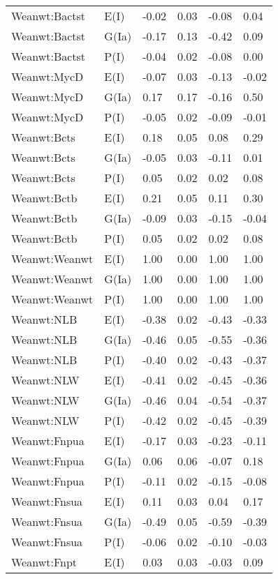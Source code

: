 \begin{center}
\begin{longtable}{|p{1.1in}|p{0.7in}|p{0.7in}|p{0.6in}|p{0.6in}|p{0.6in}|}
  Weanwt:Bactst & E(I) & -0.02 & 0.03 & -0.08 & 0.04 \\ 
  Weanwt:Bactst & G(Ia) & -0.17 & 0.13 & -0.42 & 0.09 \\ 
  Weanwt:Bactst & P(I) & -0.04 & 0.02 & -0.08 & 0.00 \\ 
  Weanwt:MycD & E(I) & -0.07 & 0.03 & -0.13 & -0.02 \\ 
  Weanwt:MycD & G(Ia) & 0.17 & 0.17 & -0.16 & 0.50 \\ 
  Weanwt:MycD & P(I) & -0.05 & 0.02 & -0.09 & -0.01 \\ 
  Weanwt:Bcts & E(I) & 0.18 & 0.05 & 0.08 & 0.29 \\ 
  Weanwt:Bcts & G(Ia) & -0.05 & 0.03 & -0.11 & 0.01 \\ 
  Weanwt:Bcts & P(I) & 0.05 & 0.02 & 0.02 & 0.08 \\ 
  Weanwt:Bctb & E(I) & 0.21 & 0.05 & 0.11 & 0.30 \\ 
  Weanwt:Bctb & G(Ia) & -0.09 & 0.03 & -0.15 & -0.04 \\ 
  Weanwt:Bctb & P(I) & 0.05 & 0.02 & 0.02 & 0.08 \\ 
  Weanwt:Weanwt & E(I) & 1.00 & 0.00 & 1.00 & 1.00 \\ 
  Weanwt:Weanwt & G(Ia) & 1.00 & 0.00 & 1.00 & 1.00 \\ 
  Weanwt:Weanwt & P(I) & 1.00 & 0.00 & 1.00 & 1.00 \\ 
  Weanwt:NLB & E(I) & -0.38 & 0.02 & -0.43 & -0.33 \\ 
  Weanwt:NLB & G(Ia) & -0.46 & 0.05 & -0.55 & -0.36 \\ 
  Weanwt:NLB & P(I) & -0.40 & 0.02 & -0.43 & -0.37 \\ 
  Weanwt:NLW & E(I) & -0.41 & 0.02 & -0.45 & -0.36 \\ 
  Weanwt:NLW & G(Ia) & -0.46 & 0.04 & -0.54 & -0.37 \\ 
  Weanwt:NLW & P(I) & -0.42 & 0.02 & -0.45 & -0.39 \\ 
  Weanwt:Fnpua & E(I) & -0.17 & 0.03 & -0.23 & -0.11 \\ 
  Weanwt:Fnpua & G(Ia) & 0.06 & 0.06 & -0.07 & 0.18 \\ 
  Weanwt:Fnpua & P(I) & -0.11 & 0.02 & -0.15 & -0.08 \\ 
  Weanwt:Fnsua & E(I) & 0.11 & 0.03 & 0.04 & 0.17 \\ 
  Weanwt:Fnsua & G(Ia) & -0.49 & 0.05 & -0.59 & -0.39 \\ 
  Weanwt:Fnsua & P(I) & -0.06 & 0.02 & -0.10 & -0.03 \\ 
  Weanwt:Fnpt & E(I) & 0.03 & 0.03 & -0.03 & 0.09 \\ 

\end{longtable}
\end{center}
